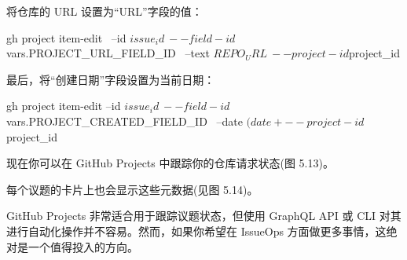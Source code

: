 将仓库的 URL 设置为“URL”字段的值：

\begin{shell}
gh project item-edit \
  --id $issue_id \
  --field-id ${{ vars.PROJECT_URL_FIELD_ID }} \
  --text $REPO_URL \
  --project-id $project_id
\end{shell}

最后，将“创建日期”字段设置为当前日期：

\begin{shell}
gh project item-edit --id $issue_id \
  --field-id ${{ vars.PROJECT_CREATED_FIELD_ID }} \
  --date $(date +%
  --project-id $project_id
\end{shell}

现在你可以在 GitHub Projects 中跟踪你的仓库请求状态(图 5.13)。


每个议题的卡片上也会显示这些元数据(见图 5.14)。


GitHub Projects 非常适合用于跟踪议题状态，但使用 GraphQL API 或 CLI 对其进行自动化操作并不容易。然而，如果你希望在 IssueOps 方面做更多事情，这绝对是一个值得投入的方向。































